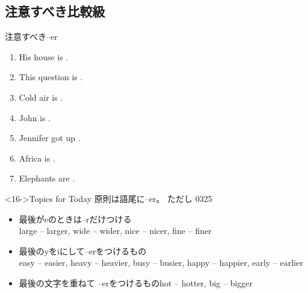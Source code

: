 \documentclass[aspectratio=169,xcolor={dvipsnames,table}]{beamer}
\begin{document}
\subsection{注意すべき比較級}
\begin{frame}[plain]{注意すべき--er} 
 \begin{enumerate}
  \item His house is .\hfill{}
  \item This question is .\hfill{}
  \item Cold air is .\hfill{}
  \item John is .\hfill{}
  \item Jennifer got up .\hfill{}
  \item Africa is .\hfill{}
  \item Elephants are .\hfill{}
 \end{enumerate}

\begin{block}<16->{Topics for Today}
{\small 原則は語尾に--er。
ただし}%
\hfill{\tiny 0325}\,{\scriptsize {}}
\begin{itemize}[square]\small
 \item 最後がeのときは--rだけつける\\\hfill{}large -- larger, wide -- wider, nice -- nicer, fine -- finer　
 \item 最後のyをiにして--erをつけるもの\\\hfill{}easy -- easier, heavy -- heavier, busy -- busier, happy -- happier, early -- earlier　
 \item 最後の文字を重ねて --erをつけるもの\hfill{}hot -- hotter, big -- bigger　
 \end{itemize}
     \end{block}

\end{frame}
\end{document}
